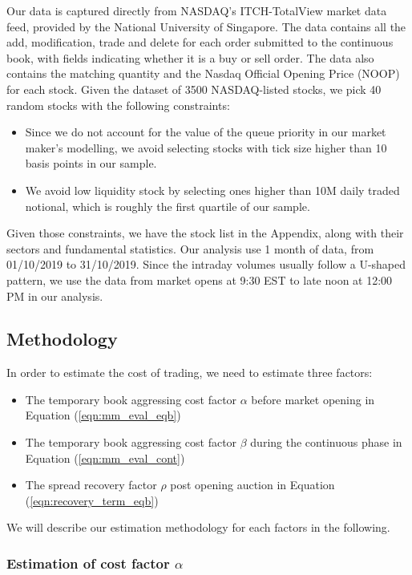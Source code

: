\documentclass{article}
\begin{document}
Our data is captured directly from NASDAQ's ITCH-TotalView market data feed, provided by the National University of Singapore. The data contains all the add, modification, trade and delete for each order submitted to the continuous book, with fields indicating whether it is a buy or sell order. The data also contains the matching quantity and the Nasdaq Official Opening Price (NOOP) for each stock. Given the dataset of 3500 NASDAQ-listed stocks, we pick 40 random stocks with the following constraints:
\begin{itemize}
  \item Since we do not account for the value of the queue priority in our market maker's modelling, we avoid selecting stocks with tick size higher than 10 basis points in our sample.
  \item We avoid low liquidity stock by selecting ones higher than 10M daily traded notional, which is roughly the first quartile of our sample.
\end{itemize}

Given those constraints, we have the stock list in the Appendix, along with their sectors and fundamental statistics. Our analysis use 1 month of data, from 01/10/2019 to 31/10/2019. Since the intraday volumes usually follow a U-shaped pattern, we use the data from market opens at 9:30 EST to late noon at 12:00 PM in our analysis.

\subsection{Methodology}

In order to estimate the cost of trading, we need to estimate three factors:
\begin{itemize}
  \item The temporary book aggressing cost factor $\alpha$ before market opening in Equation (\ref{eqn:mm_eval_eqb})
  \item The temporary book aggressing cost factor $\beta$ during the continuous phase in Equation (\ref{eqn:mm_eval_cont})
  \item The spread recovery factor $\rho$ post opening auction in Equation (\ref{eqn:recovery_term_eqb})
\end{itemize}

We will describe our estimation methodology for each factors in the following.

\subsubsection{Estimation of cost factor $\alpha$}
\end{document}
